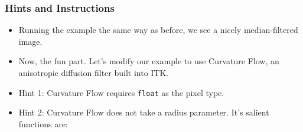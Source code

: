 \begin{frame}
\frametitle{Hints and Instructions}
\begin{itemize}
\item Running the example the same way as before, we see a nicely
median-filtered image.
\pause
\item Now, the fun part. Let's modify our example to use Curvature Flow, an
anisotropic diffusion filter built into ITK.
\end{itemize}
\end{frame}

\begin{frame}
\begin{itemize}
\item Hint 1: Curvature Flow requires \texttt{float} as the pixel
  type.
\item Hint 2: Curvature Flow does not take a radius parameter. It's
  salient functions are:

\end{itemize}
\end{frame}